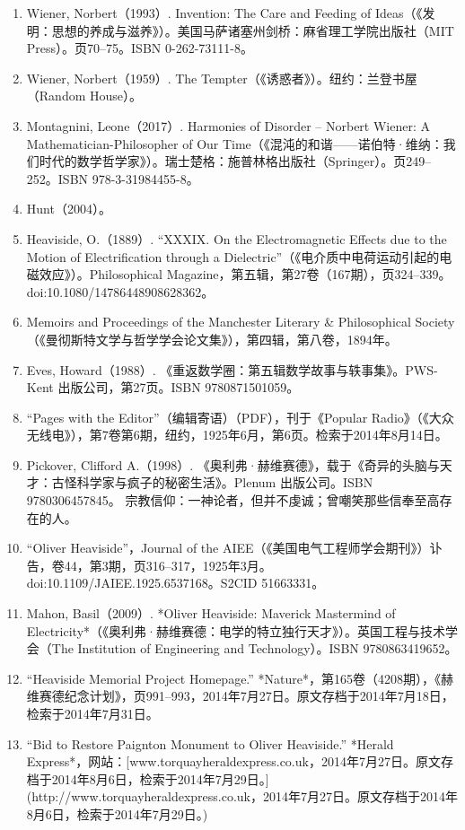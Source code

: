 \begin{enumerate}
\item Wiener, Norbert（1993）. Invention: The Care and Feeding of Ideas（《发明：思想的养成与滋养》）。美国马萨诸塞州剑桥：麻省理工学院出版社（MIT Press）。页70–75。ISBN 0-262-73111-8。
\item Wiener, Norbert（1959）. The Tempter（《诱惑者》）。纽约：兰登书屋（Random House）。
\item Montagnini, Leone（2017）. Harmonies of Disorder – Norbert Wiener: A Mathematician-Philosopher of Our Time（《混沌的和谐——诺伯特·维纳：我们时代的数学哲学家》）。瑞士楚格：施普林格出版社（Springer）。页249–252。ISBN 978-3-31984455-8。
\item Hunt（2004）。
\item Heaviside, O.（1889）. “XXXIX. On the Electromagnetic Effects due to the Motion of Electrification through a Dielectric”（《电介质中电荷运动引起的电磁效应》）。Philosophical Magazine，第五辑，第27卷（167期），页324–339。doi:10.1080/14786448908628362。
\item Memoirs and Proceedings of the Manchester Literary & Philosophical Society（《曼彻斯特文学与哲学学会论文集》），第四辑，第八卷，1894年。
\item Eves, Howard（1988）. 《重返数学圈：第五辑数学故事与轶事集》。PWS-Kent 出版公司，第27页。ISBN 9780871501059。
\item “Pages with the Editor”（编辑寄语）（PDF），刊于《Popular Radio》（《大众无线电》），第7卷第6期，纽约，1925年6月，第6页。检索于2014年8月14日。
\item Pickover, Clifford A.（1998）. 《奥利弗·赫维赛德》，载于《奇异的头脑与天才：古怪科学家与疯子的秘密生活》。Plenum 出版公司。ISBN 9780306457845。
宗教信仰：一神论者，但并不虔诚；曾嘲笑那些信奉至高存在的人。
\item “Oliver Heaviside”，Journal of the AIEE（《美国电气工程师学会期刊》）讣告，卷44，第3期，页316–317，1925年3月。doi:10.1109/JAIEE.1925.6537168。S2CID 51663331。

\item Mahon, Basil（2009）. *Oliver Heaviside: Maverick Mastermind of Electricity*（《奥利弗·赫维赛德：电学的特立独行天才》）。英国工程与技术学会（The Institution of Engineering and Technology）。ISBN 9780863419652。

\item “Heaviside Memorial Project Homepage.” *Nature*，第165卷（4208期），《赫维赛德纪念计划》，页991–993，2014年7月27日。原文存档于2014年7月18日，检索于2014年7月31日。

\item “Bid to Restore Paignton Monument to Oliver Heaviside.” *Herald Express*，网站：[www.torquayheraldexpress.co.uk，2014年7月27日。原文存档于2014年8月6日，检索于2014年7月29日。](http://www.torquayheraldexpress.co.uk，2014年7月27日。原文存档于2014年8月6日，检索于2014年7月29日。)


\end{enumerate}
